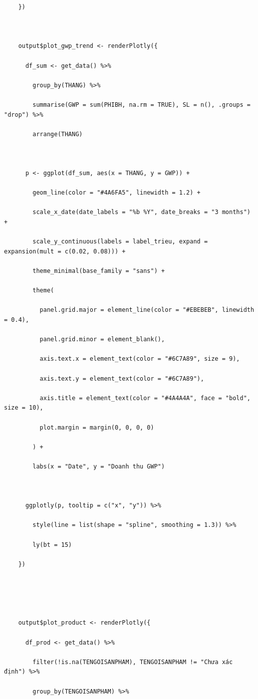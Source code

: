 \documentclass[12pt, a4paper]{article}
\begin{document}
\begin{lstlisting}
    })



    output$plot_gwp_trend <- renderPlotly({

      df_sum <- get_data() %>%

        group_by(THANG) %>%

        summarise(GWP = sum(PHIBH, na.rm = TRUE), SL = n(), .groups = "drop") %>%

        arrange(THANG)



      p <- ggplot(df_sum, aes(x = THANG, y = GWP)) +

        geom_line(color = "#4A6FA5", linewidth = 1.2) +

        scale_x_date(date_labels = "%b %Y", date_breaks = "3 months") +

        scale_y_continuous(labels = label_trieu, expand = expansion(mult = c(0.02, 0.08))) +

        theme_minimal(base_family = "sans") +

        theme(

          panel.grid.major = element_line(color = "#EBEBEB", linewidth = 0.4),

          panel.grid.minor = element_blank(),

          axis.text.x = element_text(color = "#6C7A89", size = 9),

          axis.text.y = element_text(color = "#6C7A89"),

          axis.title = element_text(color = "#4A4A4A", face = "bold", size = 10),

          plot.margin = margin(0, 0, 0, 0)

        ) +

        labs(x = "Date", y = "Doanh thu GWP")



      ggplotly(p, tooltip = c("x", "y")) %>%

        style(line = list(shape = "spline", smoothing = 1.3)) %>%

        ly(bt = 15)

    })





    output$plot_product <- renderPlotly({

      df_prod <- get_data() %>%

        filter(!is.na(TENGOISANPHAM), TENGOISANPHAM != "Chưa xác định") %>%

        group_by(TENGOISANPHAM) %>%


\end{lstlisting}
\end{document}
